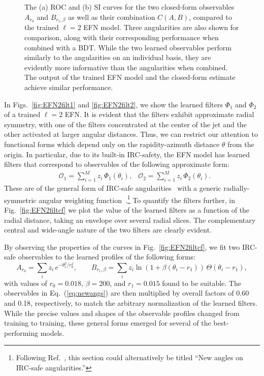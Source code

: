 \documentclass[letterpaper,11pt]{article}
\DeclareRobustCommand{\Fig}[1]{Fig.~\ref{#1}}
\DeclareRobustCommand{\Figs}[2]{Figs.~\ref{#1} and \ref{#2}}
\DeclareRobustCommand{\Eq}[1]{Eq.~(\ref{#1})}
\DeclareRobustCommand{\Ref}[1]{Ref.~\cite{#1}}
\begin{document}
\begin{figure}[t]
\centering
{}
\caption{
The (a) ROC and (b) SI curves for the two closed-form observables $A_{r_0}$ and $B_{r_1,\beta}$ as well as their combination $C(A,B)$, compared to the trained $\ell = 2$ EFN model.
%
Three angularities are also shown for comparison, along with their corresponding performance when combined with a BDT.
%
While the two learned observables perform similarly to the angularities on an individual basis, they are evidently more informative than the angularities when combined.
%
The output of the trained EFN model and the closed-form estimate achieve similar performance.}
\label{fig:EFN2ROCComp}
\end{figure}


In \Figs{fig:EFN2filt1}{fig:EFN2filt2}, we show the learned filters $\Phi_1$ and $\Phi_2$ of a trained $\ell=2$ EFN.
%
It is evident that the filters exhibit approximate radial symmetry, with one of the filters concentrated at the center of the jet and the other activated at larger angular distances.
%
Thus, we can restrict our attention to functional forms which depend only on the rapidity-azimuth distance $\theta$ from the origin.
%
In particular, due to its built-in IRC-safety, the EFN model has learned filters that correspond to observables of the following approximate form:
%
\begin{align}\label{eq:learnedobsang}
&\mathcal O_1 = \sum_{i=1}^M z_i \, \Phi_1(\theta_i), &\mathcal O_2 = \sum_{i=1}^M z_i \, \Phi_2(\theta_i).
\end{align}
%
These are of the general form of IRC-safe angularities~\cite{Larkoski:2014pca} with a generic radially-symmetric angular weighting function~\cite{Gallicchio:2012ez}.\footnote{Following \Ref{Moult:2016cvt}, this section could alternatively be titled ``New angles on IRC-safe angularities.''}
%
To quantify the filters further, in \Fig{fig:EFN2filtcf} we plot the value of the learned filters as a function of the radial distance, taking an envelope over several radial slices.
%
The complementary central and wide-angle nature of the two filters are clearly evident.


By observing the properties of the curves in \Fig{fig:EFN2filtcf}, we fit two IRC-safe observables to the learned profiles of the following forms:
%
\begin{equation}
\label{eq:newangs}
A_{r_0} = \sum_i z_i \, e^{-\theta_i^2/r_0^2},\qquad B_{r_1,\beta} = \sum_i z_i \ln(1 + \beta (\theta_i - r_1) )\, \Theta(\theta_i - r_1),
\end{equation}
%
with values of $r_0=0.018$, $\beta=200$, and $r_1=0.015$ found to be suitable.
%
The observables in \Eq{eq:newangs} are then multiplied by overall factors of 0.60 and 0.18, respectively, to match the arbitrary normalization of the learned filters.
%
While the precise values and shapes of the observable profiles changed from training to training, these general forms emerged for several of the best-performing models.
\end{document}
